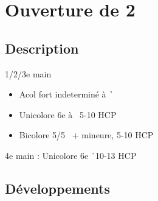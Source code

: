 \documentclass[a4paper]{article}
\begin{document}
\section{Ouverture de 2\pdfh}

\subsection{Description}

1/2/3e main

\begin{itemize}
\item Acol fort indeterminé à \h\ 

\item Unicolore 6e à \s\ 5-10 HCP 

\item Bicolore 5/5 \s\ + mineure, 5-10 HCP

\end{itemize}

\begin{bidtable}
4e \> main : Unicolore 6e \h\ 10-13 HCP
\end{bidtable}

\subsection{Développements}
\end{document}
